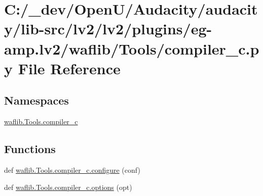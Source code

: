 \hypertarget{lv2_2plugins_2eg-amp_8lv2_2waflib_2_tools_2compiler__c_8py}{}\section{C\+:/\+\_\+dev/\+Open\+U/\+Audacity/audacity/lib-\/src/lv2/lv2/plugins/eg-\/amp.lv2/waflib/\+Tools/compiler\+\_\+c.py File Reference}
\label{lv2_2plugins_2eg-amp_8lv2_2waflib_2_tools_2compiler__c_8py}
\subsection*{Namespaces}
\begin{DoxyCompactItemize}
\item 
 \hyperlink{namespacewaflib_1_1_tools_1_1compiler__c}{waflib.\+Tools.\+compiler\+\_\+c}
\end{DoxyCompactItemize}
\subsection*{Functions}
\begin{DoxyCompactItemize}
\item 
def \hyperlink{namespacewaflib_1_1_tools_1_1compiler__c_a21492d9277532807d6c9af80d07ab9cd}{waflib.\+Tools.\+compiler\+\_\+c.\+configure} (conf)
\item 
def \hyperlink{namespacewaflib_1_1_tools_1_1compiler__c_a3700f55375e0ba3c634ddfe42b019667}{waflib.\+Tools.\+compiler\+\_\+c.\+options} (opt)
\end{DoxyCompactItemize}
